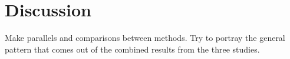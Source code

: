 \maketitle
\section{Discussion}

	Make parallels and comparisons between methods. Try to portray the general pattern that 
	comes out of the combined results from the three studies.
